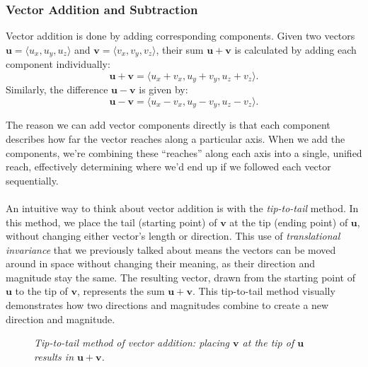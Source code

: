 \subsubsection*{Vector Addition and Subtraction}

\noindent Vector addition is done by adding corresponding components. Given two vectors \( \mathbf{u} = \langle u_x, u_y, u_z \rangle \) and \( \mathbf{v} = \langle v_x, v_y, v_z \rangle \), their sum \( \mathbf{u} + \mathbf{v} \) is calculated by adding each component individually:
\[
\mathbf{u} + \mathbf{v} = \langle u_x + v_x, u_y + v_y, u_z + v_z\rangle.
\]
Similarly, the difference \( \mathbf{u} - \mathbf{v} \) is given by:
\[
\mathbf{u} - \mathbf{v} = \langle u_x - v_x, u_y - v_y, u_z - v_z \rangle.
\]

\noindent The reason we can add vector components directly is that each component describes how far the vector reaches along a particular axis. When we add the components, we’re combining these ``reaches” along each axis into a single, unified reach, effectively determining where we’d end up if we followed each vector sequentially. \\ \\ An intuitive way to think about vector addition is with the \textit{tip-to-tail} method. In this method, we place the tail (starting point) of \( \mathbf{v} \) at the tip (ending point) of \( \mathbf{u} \), without changing either vector’s length or direction. This use of \textit{translational invariance} that we previously talked about means the vectors can be moved around in space without changing their meaning, as their direction and magnitude stay the same. The resulting vector, drawn from the starting point of \( \mathbf{u} \) to the tip of \( \mathbf{v} \), represents the sum \( \mathbf{u} + \mathbf{v} \). This tip-to-tail method visually demonstrates how two directions and magnitudes combine to create a new direction and magnitude.

\begin{figure}[H]
    \centering
    \caption{\textit{Tip-to-tail method of vector addition: placing \( \mathbf{v} \) at the tip of \( \mathbf{u} \) results in \(\mathbf{u} + \mathbf{v}\).}}
    \label{fig:vector_addition}
\end{figure}

